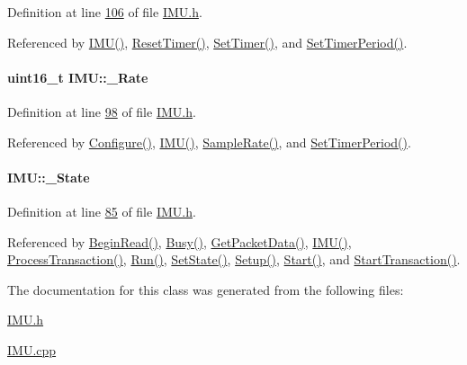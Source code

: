 Definition at line \hyperlink{_i_m_u_8h_source_l00106}{106} of file \hyperlink{_i_m_u_8h_source}{IMU.h}.



Referenced by \hyperlink{_i_m_u_8cpp_source_l00020}{IMU()}, \hyperlink{_i_m_u_8cpp_source_l00702}{ResetTimer()}, \hyperlink{_i_m_u_8cpp_source_l00685}{SetTimer()}, and \hyperlink{_i_m_u_8cpp_source_l00707}{SetTimerPeriod()}.

\hypertarget{class_i_m_u_aafe9be107385c7ccedeb1539cf6d7fce}{
\paragraph[{\_\-Rate}]{\setlength{\rightskip}{0pt plus 5cm}uint16\_\-t {\bf IMU::\_\-Rate}}\hfill}
\label{class_i_m_u_aafe9be107385c7ccedeb1539cf6d7fce}


Definition at line \hyperlink{_i_m_u_8h_source_l00098}{98} of file \hyperlink{_i_m_u_8h_source}{IMU.h}.



Referenced by \hyperlink{_i_m_u_8cpp_source_l00803}{Configure()}, \hyperlink{_i_m_u_8cpp_source_l00020}{IMU()}, \hyperlink{_i_m_u_8cpp_source_l00170}{SampleRate()}, and \hyperlink{_i_m_u_8cpp_source_l00707}{SetTimerPeriod()}.

\hypertarget{class_i_m_u_a2e3c70d02cc2b3dd98ce8153d02cf04e}{
\paragraph[{\_\-State}]{ {\bf IMU::\_\-State}}\hfill}
\label{class_i_m_u_a2e3c70d02cc2b3dd98ce8153d02cf04e}


Definition at line \hyperlink{_i_m_u_8h_source_l00085}{85} of file \hyperlink{_i_m_u_8h_source}{IMU.h}.



Referenced by \hyperlink{_i_m_u_8cpp_source_l00108}{BeginRead()}, \hyperlink{_i_m_u_8cpp_source_l00277}{Busy()}, \hyperlink{_i_m_u_8cpp_source_l00603}{GetPacketData()}, \hyperlink{_i_m_u_8cpp_source_l00020}{IMU()}, \hyperlink{_i_m_u_8cpp_source_l00348}{ProcessTransaction()}, \hyperlink{_i_m_u_8cpp_source_l00290}{Run()}, \hyperlink{_i_m_u_8h_source_l00178}{SetState()}, \hyperlink{_i_m_u_8cpp_source_l00194}{Setup()}, \hyperlink{_i_m_u_8cpp_source_l00239}{Start()}, and \hyperlink{_i_m_u_8cpp_source_l00323}{StartTransaction()}.



The documentation for this class was generated from the following files:\begin{DoxyCompactItemize}
\item 
\hyperlink{_i_m_u_8h}{IMU.h}\item 
\hyperlink{_i_m_u_8cpp}{IMU.cpp}\end{DoxyCompactItemize}
